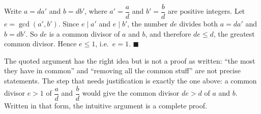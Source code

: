 Write $a=da'$ and $b=db'$, where $a'=\dfrac {a}{d}$ and $b'=\dfrac {b}{d}$ are positive integers. Let $e=\gcd(a',b')$. Since $e\mid a'$ and $e\mid b'$, the number $de$ divides both $a=da'$ and $b=db'$. So $de$ is a common divisor of $a$ and $b$, and therefore $de\le d$, the greatest common divisor. Hence $e\le1$, i.e.\ $e=1$. $\blacksquare$

The quoted argument has the right idea but is not a proof as written: ``the most they have in common'' and ``removing all the common stuff'' are not precise statements. The step that needs justification is exactly the one above: a common divisor $e>1$ of $\dfrac {a}{d}$ and $\dfrac {b}{d}$ would give the common divisor $de>d$ of $a$ and $b$. Written in that form, the intuitive argument is a complete proof.
